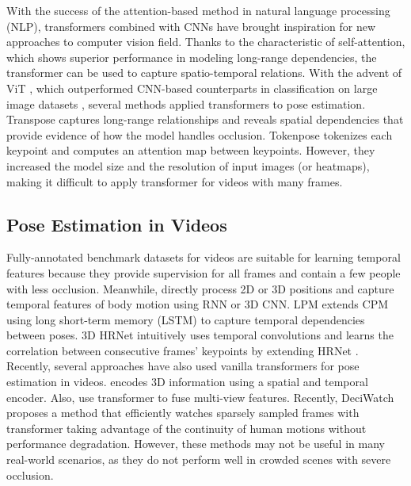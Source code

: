 \documentclass[10pt,twocolumn,letterpaper]{article}
\begin{document}
With the success of the attention-based method in natural language processing (NLP), transformers combined with CNNs have brought inspiration for new approaches \cite{vivit, vit, transpose, 3dspatiotemporal, skeletor,transfusion,epipolar,tokenpose,otpose} to computer vision field. Thanks to the characteristic of self-attention, which shows superior performance in modeling long-range dependencies, the transformer can be used to capture spatio-temporal relations. With the advent of ViT \cite{vit}, which outperformed CNN-based counterparts in classification on large image datasets \cite{coco}, several methods \cite{tokenpose,transpose} applied transformers to pose estimation. Transpose \cite{transpose} captures long-range relationships and reveals spatial dependencies that provide evidence of how the model handles occlusion. Tokenpose \cite{tokenpose} tokenizes each keypoint and computes an attention map between keypoints. However, they increased the model size and the resolution of input images (or heatmaps), making it difficult to apply transformer for videos with many frames.

\subsection{Pose Estimation in Videos}

Fully-annotated benchmark datasets \cite{jhmdb,h36m,3dpw,aist} for videos are suitable for learning temporal features because they provide supervision for all frames and contain a few people with less occlusion. Meanwhile, \cite{3dhrnet,deciwatch,lpm,dkd,kfp} directly process 2D or 3D positions and capture temporal features of body motion using RNN or 3D CNN. LPM \cite{lpm} extends CPM \cite{cpm} using long short-term memory (LSTM) to capture temporal dependencies between poses. 3D HRNet \cite{3dhrnet} intuitively uses temporal convolutions and learns the correlation between consecutive frames' keypoints by extending HRNet \cite{hrnet}. Recently, several approaches \cite{3dspatiotemporal, transfusion,skeletor,deciwatch} have also used vanilla transformers \cite{attentionisallyouneed} for pose estimation in videos. \cite{3dspatiotemporal} encodes 3D information using a spatial and temporal encoder. Also, \cite{transfusion,epipolar} use transformer to fuse multi-view features. Recently, DeciWatch \cite{deciwatch} proposes a method that efficiently watches sparsely sampled frames with transformer taking advantage of the continuity of human motions without performance degradation. However, these methods may not be useful in many real-world scenarios, as they do not perform well in crowded scenes with severe occlusion. 
\end{document}

